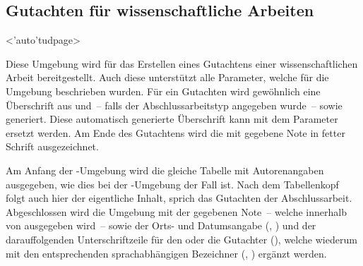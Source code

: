 \begin{DeclareEntity}{}
\section{%
  Gutachten für wissenschaftliche Arbeiten%
}

\begin{Declaration}
  {}
  <\Environment'auto'{tudpage}>
\begin{Declaration}
  {}
\begin{Declaration}
  {}
\printdeclarationlist

Diese Umgebung wird für das Erstellen eines Gutachtens einer wissenschaftlichen 
Arbeit bereitgestellt. Auch diese unterstützt alle Parameter, welche für die 
Umgebung  beschrieben wurden. Für ein Gutachten wird 
gewöhnlich eine Überschrift aus  und~-- falls der 
Abschlussarbeitstyp angegeben wurde~--  sowie 
 generiert. Diese automatisch generierte Überschrift kann mit dem 
Parameter  ersetzt werden. Am Ende des 
Gutachtens wird die mit  gegebene Note in fetter 
Schrift ausgezeichnet.

Am Anfang der -Umgebung wird die gleiche Tabelle mit 
Autorenangaben ausgegeben, wie dies bei der -Umgebung der 
Fall ist. Nach dem Tabellenkopf folgt auch hier der eigentliche Inhalt, sprich 
das Gutachten der Abschlussarbeit. Abgeschlossen wird die Umgebung mit der 
gegebenen Note~-- welche innerhalb von  ausgegeben wird~-- 
sowie der Orts- und Datumsangabe (, ) und der 
darauffolgenden Unterschriftzeile für den oder die Gutachter (), 
welche wiederum mit den entsprechenden sprachabhängigen Bezeichner 
(, ) ergänzt werden.
\end{Declaration}
\end{Declaration}
\end{Declaration}

\begin{Declaration}
  {}
\printdeclarationlist


\end{Declaration}
\end{DeclareEntity}
